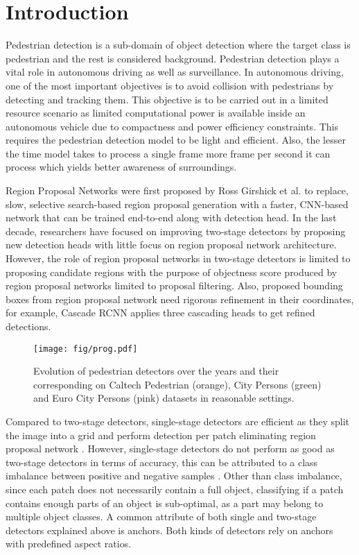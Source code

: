 \documentclass[a4paper,conference]{IEEEtran}
\begin{document}
\IEEEpeerreviewmaketitle



\section{Introduction}

Pedestrian detection is a sub-domain of object detection where the target class is pedestrian and the rest is considered background. Pedestrian detection plays a vital role in autonomous driving as well as surveillance. In autonomous driving, one of the most important objectives is to avoid collision with pedestrians by detecting and tracking them. This objective is to be carried out in a limited resource scenario as limited computational power is available inside an autonomous vehicle due to compactness and power efficiency constraints. This requires the pedestrian detection model to be light and efficient. Also, the lesser the time model takes to process a single frame more frame per second it can process which yields better awareness of surroundings.

Region Proposal Networks were first proposed by Ross Girshick et al. \cite{fasterrcnn} to replace, slow, selective search-based region proposal generation with a faster, CNN-based network that can be trained end-to-end along with detection head. In the last decade, researchers have focused on improving two-stage detectors by proposing new detection heads \cite{mgan, betarcnn, cascadercnn} with little focus on region proposal network architecture. However, the role of region proposal networks in two-stage detectors is limited to proposing candidate regions with the purpose of objectness score produced by region proposal networks limited to proposal filtering. Also, proposed bounding boxes from region proposal network need rigorous refinement in their coordinates, for example, Cascade RCNN \cite{cascadercnn} applies three cascading heads to get refined detections.

\begin{figure}
    \centering
    \texttt{[image: fig/prog.pdf]}
    \caption{Evolution of pedestrian detectors over the years and their corresponding  on Caltech Pedestrian \cite{caltech} (orange), City Persons \cite{citypersons} (green) and Euro City Persons \cite{eurocitypersons} (pink) datasets in reasonable settings.}
    \label{fig:history}
\end{figure}


Compared to two-stage detectors, single-stage detectors are efficient as they split the image into a grid and perform detection per patch eliminating region proposal network \cite{ssd, yolo, focalloss, alfnet}. However, single-stage detectors do not perform as good as two-stage detectors in terms of accuracy, this can be attributed to a class imbalance between positive and negative samples \cite{focalloss}. Other than class imbalance, since each patch does not necessarily contain a full object, classifying if a patch contains enough parts of an object is sub-optimal, as a part may belong to multiple object classes. A common attribute of both single and two-stage detectors explained above is anchors. Both kinds of detectors rely on anchors with predefined aspect ratios.
\end{document}
